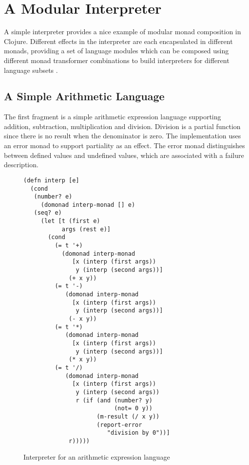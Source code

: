 \documentclass[natbib,10pt]{sigplanconf}
\begin{document}
\section{A Modular Interpreter}

A simple interpreter provides a nice example of modular monad
composition in Clojure.  Different effects in the interpreter are each
encapsulated in different monads, providing a set of language modules
which can be composed using different monad transformer combinations
to build interpreters for different language subsets
\citep{modular-interpreters}.

\subsection {A Simple Arithmetic Language}

The first fragment is a simple arithmetic expression language
supporting addition, subtraction, multiplication and division.
Division is a partial function since there is no result when the
denominator is zero.  The implementation uses an error monad to
support partiality as an effect.  The error monad distinguishes
between defined values and undefined values, which are associated
with a failure description.

\begin{figure}
\begin{center}
\begin{verbatim}
(defn interp [e]
  (cond
   (number? e) 
     (domonad interp-monad [] e)
   (seq? e)    
     (let [t (first e)
           args (rest e)]
       (cond
         (= t '+) 
           (domonad interp-monad
              [x (interp (first args))
               y (interp (second args))]
             (+ x y))
         (= t '-) 
            (domonad interp-monad
              [x (interp (first args))
               y (interp (second args))]
             (- x y))
         (= t '*) 
            (domonad interp-monad
              [x (interp (first args))
               y (interp (second args))]
             (* x y))
         (= t '/) 
            (domonad interp-monad
              [x (interp (first args))
               y (interp (second args))
               r (if (and (number? y) 
                          (not= 0 y))
                     (m-result (/ x y))
                     (report-error 
                        "division by 0"))]
             r)))))
\end{verbatim}
\end{center}
\caption{Interpreter for an arithmetic expression language}
\label{fig-interp-0}
\end{figure}
\end{document}
